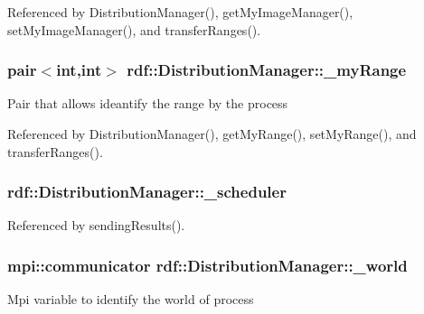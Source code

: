 Referenced by Distribution\+Manager(), get\+My\+Image\+Manager(), set\+My\+Image\+Manager(), and transfer\+Ranges().

\subsubsection[{\texorpdfstring{\+\_\+my\+Range}{_myRange}}]{\setlength{\rightskip}{0pt plus 5cm}pair$<$int,int$>$ rdf\+::\+Distribution\+Manager\+::\+\_\+my\+Range\hspace{0.3cm}{\ttfamily [private]}}\hypertarget{classrdf_1_1DistributionManager_ac6e764a519add6afff6ba14e09e45cfa}{}\label{classrdf_1_1DistributionManager_ac6e764a519add6afff6ba14e09e45cfa}
Pair that allows ideantify the range by the process 

Referenced by Distribution\+Manager(), get\+My\+Range(), set\+My\+Range(), and transfer\+Ranges().

\subsubsection[{\texorpdfstring{\+\_\+scheduler}{_scheduler}}]{ rdf\+::\+Distribution\+Manager\+::\+\_\+scheduler\hspace{0.3cm}{\ttfamily [private]}}\hypertarget{classrdf_1_1DistributionManager_a6a628c16669a4c94837597193fa95ecb}{}\label{classrdf_1_1DistributionManager_a6a628c16669a4c94837597193fa95ecb}


Referenced by sending\+Results().

\subsubsection[{\texorpdfstring{\+\_\+world}{_world}}]{\setlength{\rightskip}{0pt plus 5cm}mpi\+::communicator rdf\+::\+Distribution\+Manager\+::\+\_\+world\hspace{0.3cm}{\ttfamily [private]}}\hypertarget{classrdf_1_1DistributionManager_ac8a061176717baf96b2913cd22dcbf20}{}\label{classrdf_1_1DistributionManager_ac8a061176717baf96b2913cd22dcbf20}
Mpi variable to identify the world of process 

